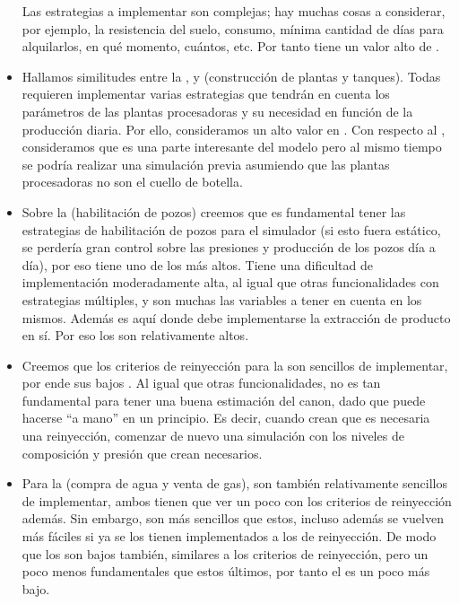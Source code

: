 \begin{itemize}
	Las estrategias a implementar son complejas; hay muchas cosas a considerar, por ejemplo, la resistencia del suelo, consumo, mínima cantidad de días para alquilarlos, en qué momento, cuántos, etc. Por tanto tiene un valor alto de \SP{}.

	\item Hallamos similitudes entre la ,  y  (construcción de plantas y tanques). Todas requieren implementar varias estrategias que tendrán en cuenta los parámetros de las plantas procesadoras y su necesidad en función de la producción diaria. Por ello, consideramos un alto valor en \SP{}. Con respecto al \BV{}, consideramos que es una parte interesante del modelo pero al mismo tiempo se podría realizar una simulación previa asumiendo que las plantas procesadoras no son el cuello de botella.

  \item Sobre la  (habilitación de pozos) creemos que es fundamental tener las estrategias de habilitación de pozos para el simulador (si esto fuera estático, se perdería gran control sobre las presiones y producción de los pozos día a día), por eso tiene uno de los \BV{} más altos. Tiene una dificultad de implementación moderadamente alta, al igual que otras funcionalidades con estrategias múltiples, y son muchas las variables a tener en cuenta en los mismos. Además es aquí donde debe implementarse la extracción de producto en sí. Por eso los \SP{} son relativamente altos. 

  \item Creemos que los criterios de reinyección para la  son sencillos de implementar, por ende sus bajos \SP{}. Al igual que otras funcionalidades, no es tan fundamental para tener una buena estimación del canon, dado que puede hacerse ``a mano'' en un principio. Es decir, cuando crean que es necesaria una reinyección, comenzar de nuevo una simulación con los niveles de composición y presión que crean necesarios.

  \item Para la  (compra de agua y venta de gas), son también relativamente sencillos de implementar, ambos tienen que ver un poco con los criterios de reinyección además. Sin embargo, son más sencillos que estos, incluso además se vuelven más fáciles si ya se los tienen implementados a los de reinyección. De modo que los \SP{} son bajos también, similares a los criterios de reinyección, pero un poco menos fundamentales que estos últimos, por tanto el \BV{} es un poco más bajo. 


\end{itemize}
